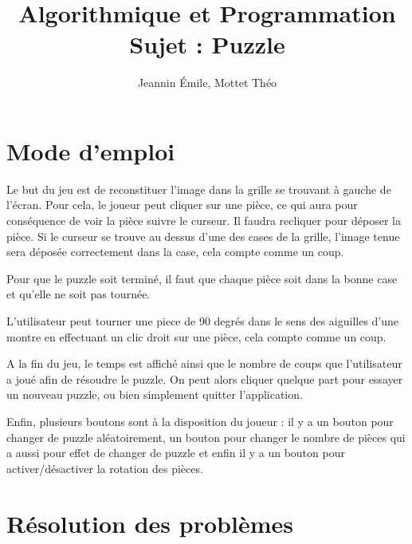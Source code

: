 \documentclass[]{article}
\title{Algorithmique et Programmation\\Sujet \no2 : Puzzle}
\author{Jeannin Émile, Mottet Théo}
\begin{document}
\maketitle
\newpage
\tableofcontents
\newpage
\section{Mode d'emploi}

Le but du jeu est de reconstituer l'image dans la grille se trouvant à gauche de l'écran. Pour cela, le joueur peut cliquer sur une pièce, ce qui aura pour conséquence de voir la pièce suivre le curseur. Il faudra recliquer pour déposer la pièce. Si le curseur se trouve au dessus d'une des cases de la grille, l'image tenue sera déposée correctement dans la case, cela compte comme un coup.

Pour que le puzzle soit terminé, il faut que chaque pièce soit dans la bonne case et qu'elle ne soit pas tournée.

L'utilisateur peut tourner une piece de 90 degrés dans le sens des aiguilles d'une montre en effectuant un clic droit sur une pièce, cela compte comme un coup.

A la fin du jeu, le temps est affiché ainsi que le nombre de coups que l'utilisateur a joué afin de résoudre le puzzle. On peut alors cliquer quelque part pour essayer un nouveau puzzle, ou bien simplement quitter l'application.

Enfin, plusieurs boutons sont à la disposition du joueur : il y a un bouton pour changer de puzzle aléatoirement, un bouton pour changer le nombre de pièces qui a aussi pour effet de changer de puzzle et enfin il y a un bouton pour activer/désactiver la rotation des pièces.

\section{Résolution des problèmes}
\end{document}
